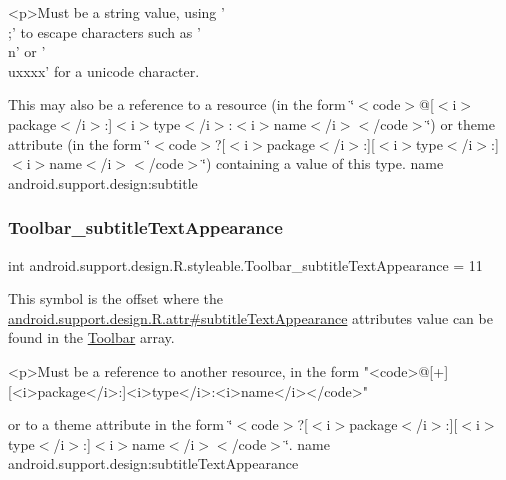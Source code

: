 \begin{DoxyVerb}      <p>Must be a string value, using '\\;' to escape characters such as '\\n' or '\\uxxxx' for a unicode character.
\end{DoxyVerb}
 

This may also be a reference to a resource (in the form \char`\"{}$<$code$>$@\mbox{[}$<$i$>$package$<$/i$>$\+:\mbox{]}$<$i$>$type$<$/i$>$\+:$<$i$>$name$<$/i$>$$<$/code$>$\char`\"{}) or theme attribute (in the form \char`\"{}$<$code$>$?\mbox{[}$<$i$>$package$<$/i$>$\+:\mbox{]}\mbox{[}$<$i$>$type$<$/i$>$\+:\mbox{]}$<$i$>$name$<$/i$>$$<$/code$>$\char`\"{}) containing a value of this type.  name android.\+support.\+design\+:subtitle \mbox{\label{classandroid_1_1support_1_1design_1_1R_1_1styleable_abb253180e44bdd9eff96211ecbe332cf}} 
\subsubsection{\texorpdfstring{Toolbar\+\_\+subtitle\+Text\+Appearance}{Toolbar\_subtitleTextAppearance}}
{\footnotesize\ttfamily int android.\+support.\+design.\+R.\+styleable.\+Toolbar\+\_\+subtitle\+Text\+Appearance = 11\hspace{0.3cm}{\ttfamily [static]}}

This symbol is the offset where the \hyperlink{classandroid_1_1support_1_1design_1_1R_1_1attr_a98ff73280c3e52b8adee36f97a9dd329}{android.\+support.\+design.\+R.\+attr\#subtitle\+Text\+Appearance} attribute\textquotesingle{}s value can be found in the \hyperlink{classandroid_1_1support_1_1design_1_1R_1_1styleable_a7783ebe780dbe2a845802a40519a46e9}{Toolbar} array.

\begin{DoxyVerb}      <p>Must be a reference to another resource, in the form "<code>@[+][<i>package</i>:]<i>type</i>:<i>name</i></code>"
\end{DoxyVerb}
 or to a theme attribute in the form \char`\"{}$<$code$>$?\mbox{[}$<$i$>$package$<$/i$>$\+:\mbox{]}\mbox{[}$<$i$>$type$<$/i$>$\+:\mbox{]}$<$i$>$name$<$/i$>$$<$/code$>$\char`\"{}.  name android.\+support.\+design\+:subtitle\+Text\+Appearance \mbox{\label{classandroid_1_1support_1_1design_1_1R_1_1styleable_a0924fc01dfcdf4dd5e6b63188a1248f3}} 
